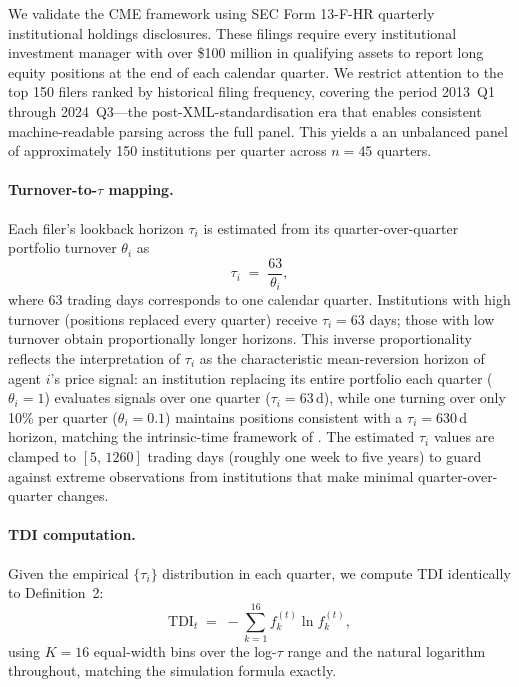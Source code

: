 \documentclass[10pt,twocolumn]{article}
\begin{document}
We validate the CME framework using SEC Form 13-F-HR quarterly institutional
holdings disclosures.  These filings require every institutional investment
manager with over \$100 million in qualifying assets to report long equity
positions at the end of each calendar quarter.  We restrict attention to the
top 150 filers ranked by historical filing frequency, covering the period
2013~Q1 through 2024~Q3---the post-XML-standardisation era that enables
consistent machine-readable parsing across the full panel.  This yields a
an unbalanced panel of approximately 150 institutions per quarter across $n=45$ quarters.

\paragraph{Turnover-to-$\tau$ mapping.}
Each filer's lookback horizon $\tau_i$ is estimated from its
quarter-over-quarter portfolio turnover $\theta_i$ as
\begin{equation}
  \tau_i \;=\; \frac{63}{\theta_i},
  \label{eq:tau_turnover}
\end{equation}
where 63 trading days corresponds to one calendar quarter.  Institutions
with high turnover (positions replaced every quarter) receive $\tau_i = 63$
days; those with low turnover obtain proportionally longer horizons.
This inverse proportionality reflects the interpretation of $\tau_i$ as the characteristic mean-reversion horizon of agent $i$'s price signal: an institution replacing its entire portfolio each quarter ($\theta_i = 1$) evaluates signals over one quarter ($\tau_i = 63$\,d), while one turning over only 10\% per quarter ($\theta_i = 0.1$) maintains positions consistent with a $\tau_i = 630$\,d horizon, matching the intrinsic-time framework of \cite{ref1}.
The estimated $\tau_i$ values are clamped to $[5,\, 1260]$ trading days
(roughly one week to five years) to guard against extreme observations from
institutions that make minimal quarter-over-quarter changes.

\paragraph{TDI computation.}
Given the empirical $\{\tau_i\}$ distribution in each quarter, we compute
TDI identically to Definition~2:
\[
  \mathrm{TDI}_t \;=\; -\sum_{k=1}^{16} f_k^{(t)} \ln f_k^{(t)},
\]
using $K=16$ equal-width bins over the log-$\tau$ range and the natural
logarithm throughout, matching the simulation formula exactly.
\end{document}

